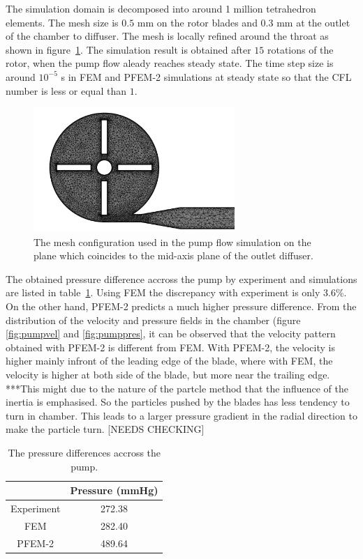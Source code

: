 The simulation domain is decomposed into around 1 million tetrahedron elements. The mesh size is $0.5$ mm on the rotor blades and $0.3$ mm at the outlet of the chamber to diffuser. The mesh is locally refined around the throat as shown in figure~\ref{fig:pumpmesh}. The simulation result is obtained after $15$ rotations of the rotor, when the pump flow aleady reaches steady state. The time step size is around $10^{-5}$ s in FEM and PFEM-2 simulations at steady state so that the CFL number is less or equal than $1$.  

\begin{figure}[htbp]
    \centering
    \includegraphics[width=3in]{imgs/nozzle_pump/pump_mesh.pdf}
    \caption{The mesh configuration used in the pump flow simulation on the plane which coincides to the mid-axis plane of the outlet diffuser.}
    \label{fig:pumpmesh}
\end{figure}


The obtained pressure difference accross the pump by experiment and simulations are listed in table~\ref{tab:pumppres}. Using FEM the discrepancy with experiment is only $3.6$\%. On the other hand, PFEM-2 predicts a much higher pressure difference. From the distribution of the velocity and pressure fields in the chamber (figure \ref{fig:pumpvel} and \ref{fig:pumppres}, it can be observed that the velocity pattern obtained with PFEM-2 is different from FEM. With PFEM-2, the velocity is higher mainly infront of the leading edge of the blade, where with FEM, the velocity is higher at both side of the blade, but more near the trailing edge. ***This might due to the nature of the partcle method that the influence of the inertia is emphasised. So the particles pushed by the blades has less tendency to turn in chamber. This leads to a larger pressure gradient in the radial direction to make the particle turn. [NEEDS CHECKING] 

\begin{table}[h]
\caption {The pressure differences accross the pump.}\label{tab:pumppres} 
\centering
\begin{tabular}{|c|c|}
\hline
 & Pressure (mmHg) \\ \hline
Experiment \cite{mali_cfd}    & 272.38    \\ \hline
FEM    & 282.40             \\ \hline
PFEM-2    & 489.64          \\ \hline
\end{tabular}
\end{table}

